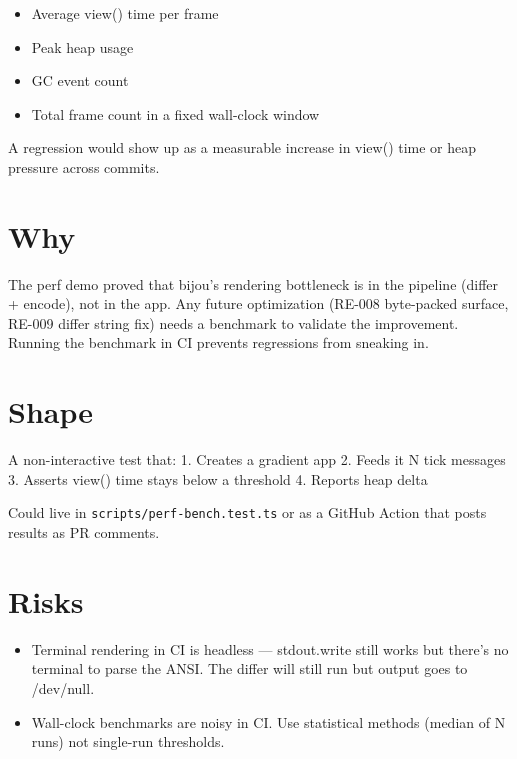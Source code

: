 \begin{itemize}
\tightlist
\item
  Average view() time per frame
\item
  Peak heap usage
\item
  GC event count
\item
  Total frame count in a fixed wall-clock window
\end{itemize}

A regression would show up as a measurable increase in view() time or heap pressure across commits.

\section{Why}\label{record-347-why}

The perf demo proved that bijou's rendering bottleneck is in the pipeline (differ + encode), not in the app. Any future optimization (RE-008 byte-packed surface, RE-009 differ string fix) needs a benchmark to validate the improvement. Running the benchmark in CI prevents regressions from sneaking in.

\section{Shape}\label{record-347-shape}

A non-interactive test that: 1. Creates a gradient app 2. Feeds it N tick messages 3. Asserts view() time stays below a threshold 4. Reports heap delta

Could live in \texttt{s\allowbreak{}c\allowbreak{}r\allowbreak{}i\allowbreak{}p\allowbreak{}t\allowbreak{}s\allowbreak{}/\allowbreak{}p\allowbreak{}e\allowbreak{}r\allowbreak{}f\allowbreak{}-\allowbreak{}b\allowbreak{}e\allowbreak{}n\allowbreak{}c\allowbreak{}h\allowbreak{}.\allowbreak{}t\allowbreak{}e\allowbreak{}s\allowbreak{}t\allowbreak{}.\allowbreak{}t\allowbreak{}s} or as a GitHub Action that posts results as PR comments.

\section{Risks}\label{record-347-risks}

\begin{itemize}
\tightlist
\item
  Terminal rendering in CI is headless --- stdout.write still works but there's no terminal to parse the ANSI. The differ will still run but output goes to /dev/null.
\item
  Wall-clock benchmarks are noisy in CI. Use statistical methods (median of N runs) not single-run thresholds.
\end{itemize}

